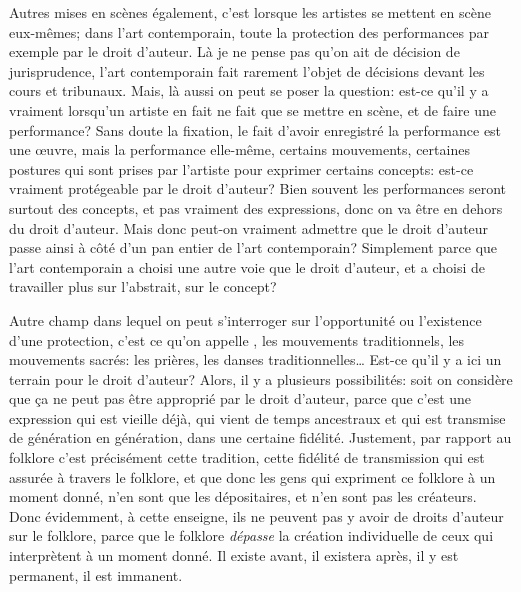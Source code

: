 {Autres mises en sc\`enes \'egalement, c'est lorsque les artistes se
mettent en sc\`ene eux{}-m\^emes; dans l'art contemporain, toute la
protection des performances par exemple par le droit d'auteur. L\`a je
ne pense pas qu'on ait de d\'ecision de jurisprudence, l'art
contemporain fait rarement l'objet de d\'ecisions devant les cours et
tribunaux. Mais, l\`a aussi on peut se poser la question: est{}-ce
qu'il y a vraiment  lorsqu'un artiste en fait ne fait que se
mettre en sc\`ene, et de faire une performance? Sans doute la fixation,
le fait d'avoir enregistr\'e la performance est une {\oe}uvre, mais la
performance elle{}-m\^eme, certains mouvements, certaines postures qui
sont prises par l'artiste pour exprimer certains concepts: est{}-ce
vraiment prot\'egeable par le droit d'auteur? Bien souvent les
performances seront surtout des concepts, et pas vraiment des
expressions, donc on va \^etre en dehors du droit d'auteur. Mais donc
peut{}-on vraiment admettre que le droit d'auteur passe ainsi \`a
c\^ot\'e d'un pan entier de l'art contemporain? Simplement parce que
l'art contemporain a choisi une autre voie que le droit d'auteur, et a
choisi de travailler plus sur l'abstrait, sur le concept?\par

Autre champ dans lequel on peut s'interroger sur l'opportunit\'e
ou l'existence d'une protection, c'est ce qu'on appelle , les mouvements traditionnels, les mouvements
sacr\'es: les pri\`eres, les danses traditionnelles{\dots} Est{}-ce
qu'il y a ici un terrain pour le droit d'auteur? Alors, il y a
plusieurs possibilit\'es: soit on consid\`ere que \c{c}a ne peut pas
\^etre appropri\'e par le droit d'auteur, parce que c'est une
expression qui est vieille d\'ej\`a, qui vient de temps ancestraux et
qui est transmise de g\'en\'eration en g\'en\'eration, dans une
certaine fid\'elit\'e. Justement, par rapport au folklore c'est
pr\'ecis\'ement cette tradition, cette fid\'elit\'e de transmission qui
est assur\'ee \`a travers le folklore, et que donc les gens qui
expriment ce folklore \`a un moment donn\'e, n'en sont que les
d\'epositaires, et n'en sont pas les cr\'eateurs. Donc \'evidemment,
\`a cette enseigne, ils ne peuvent pas y avoir de droits d'auteur sur
le folklore, parce que le folklore {\em d\'epasse} la cr\'eation
individuelle de ceux qui interpr\`etent \`a un moment donn\'e. Il
existe avant, il existera apr\`es, il y est permanent, il est immanent.\par

}

